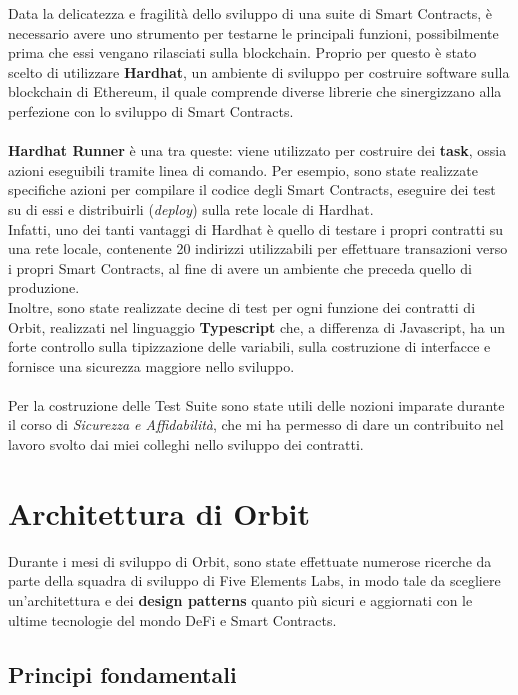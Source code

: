 \documentclass[12pt,a4paper]{report}
\begin{document}
Data la delicatezza e fragilità dello sviluppo di una suite di Smart Contracts, è necessario avere uno strumento per testarne le principali funzioni, possibilmente prima che essi vengano rilasciati sulla blockchain. Proprio per questo è stato scelto di utilizzare \textbf{Hardhat}\cite{hardhat}, un ambiente di sviluppo per costruire software sulla blockchain di Ethereum, il quale comprende diverse librerie che sinergizzano alla perfezione con lo sviluppo di Smart Contracts.\\\\\textbf{Hardhat Runner} è una tra queste: viene utilizzato per costruire dei \textbf{task}, ossia azioni eseguibili tramite linea di comando.
Per esempio, sono state realizzate specifiche azioni per compilare il codice degli Smart Contracts, eseguire dei test su di essi e distribuirli (\textit{deploy}) sulla rete locale di Hardhat.
\\Infatti, uno dei tanti vantaggi di Hardhat è quello di testare i propri contratti su una rete locale, contenente 20 indirizzi utilizzabili per effettuare transazioni verso i propri Smart Contracts, al fine di avere un ambiente che preceda quello di produzione.
\\Inoltre, sono state realizzate decine di test per ogni funzione dei contratti di Orbit, realizzati nel linguaggio \textbf{Typescript} che, a differenza di Javascript, ha un forte controllo sulla tipizzazione delle variabili, sulla costruzione di interfacce e fornisce una sicurezza maggiore nello sviluppo.
\\\\Per la costruzione delle Test Suite sono state utili delle nozioni imparate durante il corso di \textit{Sicurezza e Affidabilità}, che mi ha permesso di dare un contribuito nel lavoro svolto dai miei colleghi nello sviluppo dei contratti.


\chapter{Architettura di Orbit}

Durante i mesi di sviluppo di Orbit, sono state effettuate numerose ricerche da parte della squadra di sviluppo di Five Elements Labs, in modo tale da scegliere un'architettura e dei \textbf{design patterns} quanto più sicuri e aggiornati con le ultime tecnologie del mondo DeFi e Smart Contracts.

\section{Principi fondamentali}
\end{document}
